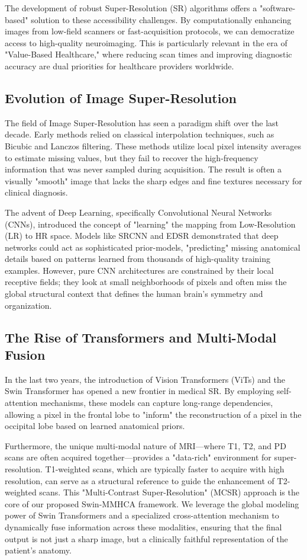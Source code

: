 \documentclass{IEEEoj}
\begin{document}
The development of robust Super-Resolution (SR) algorithms offers a "software-based" solution to these accessibility challenges. By computationally enhancing images from low-field scanners or fast-acquisition protocols, we can democratize access to high-quality neuroimaging. This is particularly relevant in the era of "Value-Based Healthcare," where reducing scan times and improving diagnostic accuracy are dual priorities for healthcare providers worldwide.

\subsection{Evolution of Image Super-Resolution}
The field of Image Super-Resolution has seen a paradigm shift over the last decade. Early methods relied on classical interpolation techniques, such as Bicubic and Lanczos filtering. These methods utilize local pixel intensity averages to estimate missing values, but they fail to recover the high-frequency information that was never sampled during acquisition. The result is often a visually "smooth" image that lacks the sharp edges and fine textures necessary for clinical diagnosis.

The advent of Deep Learning, specifically Convolutional Neural Networks (CNNs), introduced the concept of "learning" the mapping from Low-Resolution (LR) to HR space. Models like SRCNN and EDSR demonstrated that deep networks could act as sophisticated prior-models, "predicting" missing anatomical details based on patterns learned from thousands of high-quality training examples. However, pure CNN architectures are constrained by their local receptive fields; they look at small neighborhoods of pixels and often miss the global structural context that defines the human brain's symmetry and organization.

\subsection{The Rise of Transformers and Multi-Modal Fusion}
In the last two years, the introduction of Vision Transformers (ViTs) and the Swin Transformer has opened a new frontier in medical SR. By employing self-attention mechanisms, these models can capture long-range dependencies, allowing a pixel in the frontal lobe to "inform" the reconstruction of a pixel in the occipital lobe based on learned anatomical priors. 

Furthermore, the unique multi-modal nature of MRI—where T1, T2, and PD scans are often acquired together—provides a "data-rich" environment for super-resolution. T1-weighted scans, which are typically faster to acquire with high resolution, can serve as a structural reference to guide the enhancement of T2-weighted scans. This "Multi-Contrast Super-Resolution" (MCSR) approach is the core of our proposed Swin-MMHCA framework. We leverage the global modeling power of Swin Transformers and a specialized cross-attention mechanism to dynamically fuse information across these modalities, ensuring that the final output is not just a sharp image, but a clinically faithful representation of the patient's anatomy.
\end{document}
